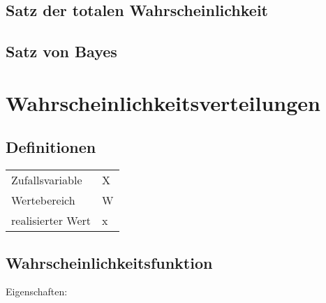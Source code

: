 \documentclass[8pt,a4paper]{scrartcl}
\begin{document}
\begin{multicols*}{3}
\subsection{Satz der totalen Wahrscheinlichkeit}




\subsection{Satz von Bayes}



\section{Wahrscheinlichkeitsverteilungen}

\subsection{Definitionen}

\begin{tabular}{ll}
Zufallsvariable & X\\
Wertebereich & W\\
realisierter Wert & x\\
\end{tabular}


\subsection{Wahrscheinlichkeitsfunktion}


Eigenschaften:


\end{multicols*}
\end{document}

